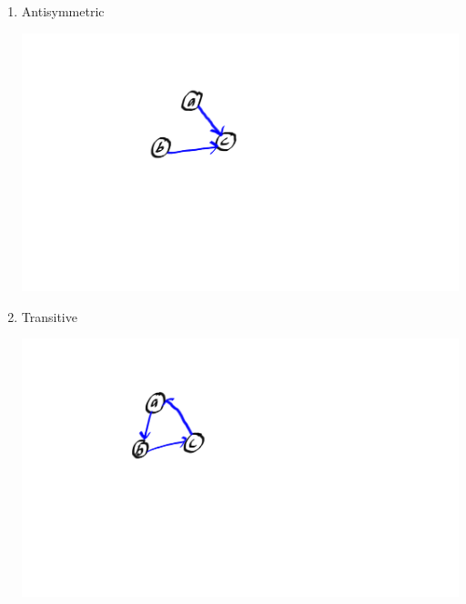 \documentclass[12pt]{article}
\begin{document}
\begin{enumerate}
\begin{enumerate}
\item Antisymmetric
    \begin{center}
    \includegraphics[scale=0.50]{antisymmerty.png}
    \end{center}
\item Transitive
    \begin{center}
    \includegraphics[scale=0.50]{transitive.png}
    \end{center}
\end{enumerate}
\end{enumerate}
\pagebreak
\end{document}
